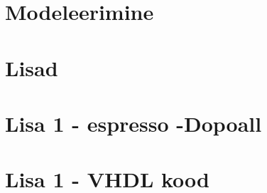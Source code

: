 \documentclass[12pt, a4paper]{report}
\begin{document}
\chapter{Modeleerimine}\label{chapter:modeleerimine}


%

%

%

%


\pagebreak
{}
\appendix
{}
\chapter*{Lisad}
\renewcommand{\thechapter}{\arabic{chapter}}

\label{appendix:espresso:dopoall}
{\let\clearpage\relax\chapter*{Lisa 1 - espresso -Dopoall}}


\label{appendix:vhdl}
{\let\clearpage\relax\chapter*{Lisa 1 - VHDL kood}}


%
\end{document}
